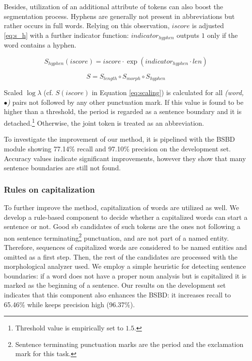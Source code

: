 Besides, utilization of an additional attribute of tokens can also boost the segmentation process.
Hyphens are generally not present in abbreviations but rather occurs in full words. 
Relying on this observation, $iscore$ is adjusted \eqref{eq:s_h} with a further indicator function:
$indicator_{hyphen}$ outputs $1$ only if the word contains a hyphen. 

\begin{equation} \label{eq:s_h}
S_{hyphen}(iscore)= iscore \cdot \exp{(indicator_{hyphen} \cdot len)}
\end{equation}

\begin{equation} \label{eq:scaling}
S = S_{length} \circ S_{morph} \circ S_{hyphen}
\end{equation}

Scaled $\log \lambda$ (cf. $S(iscore)$ in Equation \ref{eq:scaling}) is calculated for all \emph{(word, $\bullet$)} pairs not followed by any other punctuation mark. 
If this value is found to be higher than a threshold, the period is regarded as a sentence boundary and it is detached.\footnote{Threshold value is empirically set to $1.5$.} 
Otherwise, the joint token is treated as an abbreviation.

To investigate the improvement of our method, it is pipelined with the BSBD module showing 77.14\% recall and 97.10\% precision on the development set. 
Accuracy values indicate significant improvements, however they show that many sentence boundaries are still not found.

\subsubsection{Rules on capitalization}

To further improve the method, capitalization of words are utilized as well. 
We develop a rule-based component to decide whether a capitalized words can start a sentence or not.
Good \acrshort{sb} candidates of such tokens are the ones not following a non sentence terminating\footnote{Sentence terminating punctuation marks are the period and the exclamation mark for this task.} punctuation, and are not part of a named entity. 
Therefore, sequences of capitalized words are considered to be named entities and omitted as a first step. 
Then, the rest of the candidates are processed with the morphological analyzer used.
We employ a simple heuristic for detecting sentence boundaries:
if a word does not have a proper noun analysis but is capitalized it is marked as the beginning of a sentence.  
Our results on the development set indicates that this component also enhances the BSBD: it increases recall to 65.46\% while keeps precision high (96.37\%). 


